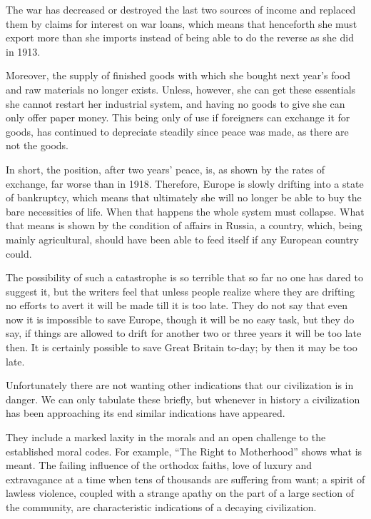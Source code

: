 \documentclass{book}
\begin{document}
The war has decreased or destroyed the last two sources of income and replaced them by claims for interest on war loans, which means that henceforth she must export more than she imports instead of being able to do the reverse as she did in 1913.

Moreover, the supply of finished goods with which she bought next year’s food and raw materials no longer exists. Unless, however, she can get these essentials she cannot restart her industrial system, and having no goods to give she can only offer paper money. This being only of use if foreigners can exchange it for goods, has continued to depreciate steadily since peace was made, as there are not the goods.

In short, the position, after two years’ peace, is, as shown by the rates of exchange, far worse than in 1918. Therefore, Europe is slowly drifting into a state of bankruptcy, which means that ultimately she will no longer be able to buy the bare necessities of life. When that happens the whole system must collapse. What that means is shown by the condition of affairs in Russia, a country, which, being mainly agricultural, should have been able to feed itself if any European country could.

The possibility of such a catastrophe is so terrible that so far no one has dared to suggest it, but the writers feel that unless people realize where they are drifting no efforts to avert it will be made till it is too late. They do not say that even now it is impossible to save Europe, though it will be no easy task, but they do say, if things are allowed to drift for another two or three years it will be too late then. It is certainly possible to save Great Britain to-day; by then it may be too late.

Unfortunately there are not wanting other indications that our civilization is in danger. We can only tabulate these briefly, but whenever in history a civilization has been approaching its end similar indications have appeared.

They include a marked laxity in the morals and an open challenge to the established moral codes. For example, “The Right to Motherhood” shows what is meant. The failing influence of the orthodox faiths, love of luxury and extravagance at a time when tens of thousands are suffering from want; a spirit of lawless violence, coupled with a strange apathy on the part of a large section of the community, are characteristic indications of a decaying civilization.
\end{document}
